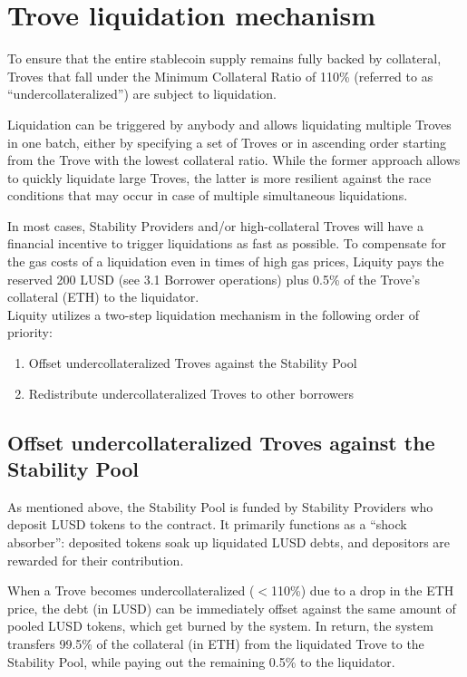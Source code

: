 \documentclass{article}
\begin{document}
\section{Trove liquidation mechanism}
To ensure that the entire stablecoin supply remains fully backed by collateral, Troves that fall under the Minimum Collateral Ratio of 110\% (referred to as “undercollateralized”) are subject to liquidation.

Liquidation can be triggered by anybody and allows liquidating multiple Troves in one batch, either by specifying a set of Troves or in ascending order starting from the Trove with the lowest collateral ratio. While the former approach allows to quickly liquidate large Troves, the latter is more resilient against the race conditions that may occur in case of multiple simultaneous liquidations.

In most cases, Stability Providers and/or high-collateral Troves will have a financial incentive to trigger liquidations as fast as possible. To compensate for the gas costs of a liquidation even in times of high gas prices, Liquity pays the reserved 200 LUSD (see 3.1 Borrower operations) plus 0.5\% of the Trove’s collateral (ETH) to the liquidator.
\\

Liquity utilizes a two-step liquidation mechanism in the following order of priority:
\begin{enumerate}
    \item Offset undercollateralized Troves against the Stability Pool
    \item Redistribute undercollateralized Troves to other borrowers
\end{enumerate}

\subsection{Offset undercollateralized Troves against the Stability Pool}
As mentioned above, the Stability Pool is funded by Stability Providers who deposit LUSD tokens to the contract. It primarily functions as a “shock absorber”: deposited tokens soak up liquidated LUSD debts, and depositors are rewarded for their contribution. 

When a Trove becomes undercollateralized ($<$110\%) due to a drop in the ETH price, the debt (in LUSD) can be immediately offset against the same amount of pooled LUSD tokens, which get burned by the system. In return, the system transfers 99.5\% of the collateral (in ETH) from the liquidated Trove to the Stability Pool, while paying out the remaining 0.5\% to the liquidator.\\
\end{document}
